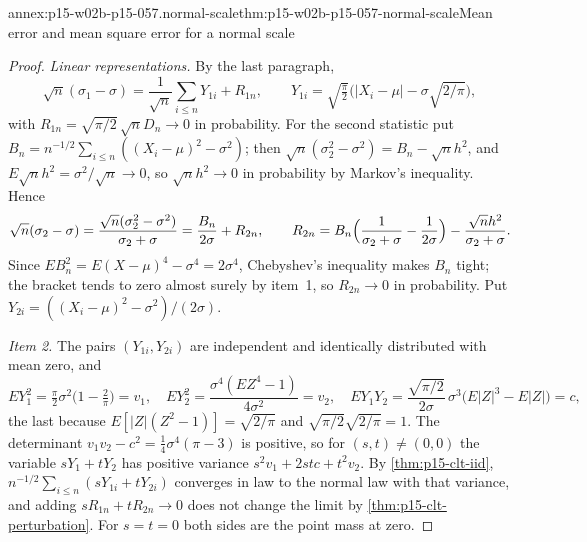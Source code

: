 \begin{annexitem}{annex:p15-w02b-p15-057.normal-scale}{thm:p15-w02b-p15-057-normal-scale}{Mean error and mean square error for a normal scale}
\begin{proof}
\emph{Linear representations.} By the last paragraph,
\[
 \sqrt n(\sigma_1-\sigma)=\frac1{\sqrt n}\sum_{i\leq n}Y_{1i}+R_{1n},\qquad
 Y_{1i}=\sqrt{\tfrac\pi2}\bigl(|X_i-\mu|-\sigma\sqrt{2/\pi}\bigr),
\]
with \(R_{1n}=\sqrt{\pi/2}\,\sqrt n D_n\to0\) in probability. For the
second statistic put \(B_n=n^{-1/2}\sum_{i\leq n}((X_i-\mu)^2-\sigma^2)\);
then \(\sqrt n(\sigma_2^2-\sigma^2)=B_n-\sqrt n h^2\), and
\(E\sqrt n h^2=\sigma^2/\sqrt n\to0\), so \(\sqrt nh^2\to0\) in
probability by Markov's inequality. Hence
\[
 \sqrt n(\sigma_2-\sigma)=\frac{\sqrt n(\sigma_2^2-\sigma^2)}{\sigma_2+\sigma}
 =\frac{B_n}{2\sigma}+R_{2n},\qquad
 R_{2n}=B_n\Bigl(\frac1{\sigma_2+\sigma}-\frac1{2\sigma}\Bigr)
 -\frac{\sqrt nh^2}{\sigma_2+\sigma}.
\]
Since \(EB_n^2=E(X-\mu)^4-\sigma^4=2\sigma^4\), Chebyshev's inequality
makes \(B_n\) tight; the bracket tends to zero almost surely by item~1, so
\(R_{2n}\to0\) in probability. Put \(Y_{2i}=((X_i-\mu)^2-\sigma^2)/(2\sigma)\).

\emph{Item 2.} The pairs \((Y_{1i},Y_{2i})\) are independent and
identically distributed with mean zero, and
\[
 EY_1^2=\tfrac\pi2\sigma^2\bigl(1-\tfrac2\pi\bigr)=v_1,\quad
 EY_2^2=\frac{\sigma^4(EZ^4-1)}{4\sigma^2}=v_2,\quad
 EY_1Y_2=\frac{\sqrt{\pi/2}}{2\sigma}\,\sigma^3\bigl(E|Z|^3-E|Z|\bigr)=c,
\]
the last because \(E[|Z|(Z^2-1)]=\sqrt{2/\pi}\) and \(\sqrt{\pi/2}\sqrt{2/\pi}=1\).
The determinant \(v_1v_2-c^2=\tfrac14\sigma^4(\pi-3)\) is positive, so for
\((s,t)\neq(0,0)\) the variable \(sY_1+tY_2\) has positive variance
\(s^2v_1+2stc+t^2v_2\). By \cref{thm:p15-clt-iid},
\(n^{-1/2}\sum_{i\leq n}(sY_{1i}+tY_{2i})\) converges in law to the normal
law with that variance, and adding \(sR_{1n}+tR_{2n}\to0\) does not change
the limit by \cref{thm:p15-clt-perturbation}. For \(s=t=0\) both sides are
the point mass at zero.


\end{proof}
\end{annexitem}
